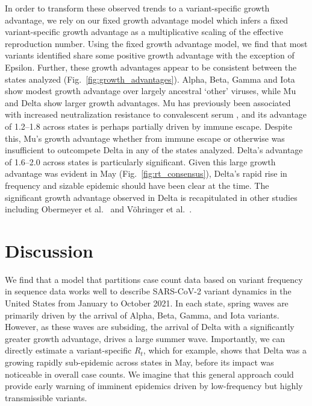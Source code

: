 \documentclass[11pt,oneside,letterpaper]{article}
\begin{document}
In order to transform these observed trends to a variant-specific growth advantage, we rely on our fixed growth advantage model which infers a fixed variant-specific growth advantage as a multiplicative scaling of the effective reproduction number.
Using the fixed growth advantage model, we find that most variants identified share some positive growth advantage with the exception of Epsilon.
Further, these growth advantages appear to be consistent between the states analyzed (Fig.\ \ref{fig:growth_advantages}).
Alpha, Beta, Gamma and Iota show modest growth advantage over largely ancestral `other' viruses, while Mu and Delta show larger growth advantages.
Mu has previously been associated with increased neutralization resistance to convalescent serum \cite{Uriu2021}, and its advantage of 1.2--1.8 across states is perhaps partially driven by immune escape.
Despite this, Mu's growth advantage whether from immune escape or otherwise was insufficient to outcompete Delta in any of the states analyzed.
Delta's advantage of 1.6--2.0 across states is particularly significant.
Given this large growth advantage was evident in May (Fig.\ \ref{fig:rt_consensus}), Delta's rapid rise in frequency and sizable epidemic should have been clear at the time.
The significant growth advantage observed in Delta is recapitulated in other studies including Obermeyer et al.\ \cite{Obermeyer2021} and V\"ohringer et al.\ \cite{vohringer2021genomic}.

\section*{Discussion}

We find that a model that partitions case count data based on variant frequency in sequence data works well to describe SARS-CoV-2 variant dynamics in the United States from January to October 2021.
In each state, spring waves are primarily driven by the arrival of Alpha, Beta, Gamma, and Iota variants.
However, as these waves are subsiding, the arrival of Delta with a significantly greater growth advantage, drives a large summer wave.
Importantly, we can directly estimate a variant-specific $R_{t}$, which for example, shows that Delta was a growing rapidly sub-epidemic across states in May, before its impact was noticeable in overall case counts.
We imagine that this general approach could provide early warning of imminent epidemics driven by low-frequency but highly transmissible variants.
\end{document}
